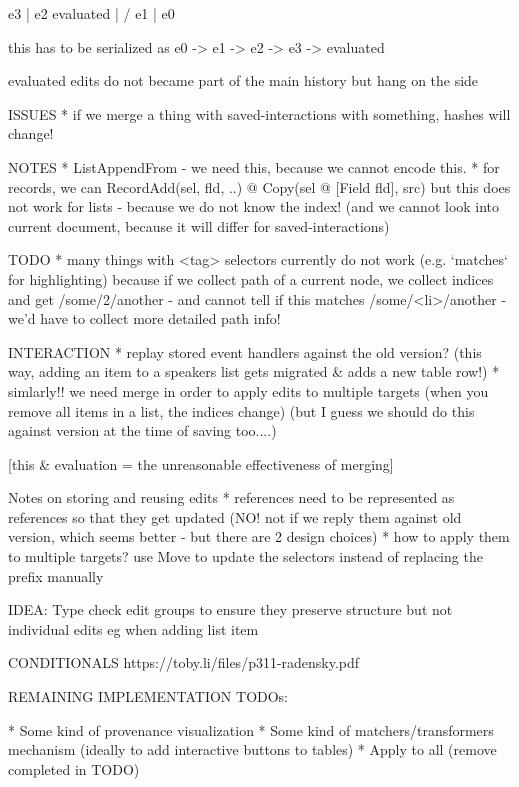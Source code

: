 \documentclass[sigconf,anonymous,screen]{acmart}
\begin{document}
  e3
  |
  e2   evaluated
  |  /
  e1
  |
  e0

  this has to be serialized as e0 -> e1 -> e2 -> e3 -> evaluated

  evaluated edits do not became part of the main history
  but hang on the side

ISSUES
* if we merge a thing with saved-interactions with something, hashes will change!

NOTES
* ListAppendFrom - we need this, because we cannot encode this.
* for records, we can RecordAdd(sel, fld, ..) @ Copy(sel @ [Field fld], src) but
  this does not work for lists - because we do not know the index!
  (and we cannot look into current document, because it will differ for saved-interactions)


TODO
* many things with <tag> selectors currently do not work
  (e.g. `matches` for highlighting) because if we collect path of a current node,
  we collect indices and get /some/2/another - and cannot tell if this matches
  /some/<li>/another - we'd have to collect more detailed path info!

INTERACTION
* replay stored event handlers against the old version?
  (this way, adding an item to a speakers list gets migrated \& adds a new table row!)
* simlarly!! we need merge in order to apply edits to multiple targets
  (when you remove all items in a list, the indices change)
  (but I guess we should do this against version at the time of saving too....)

[this \& evaluation = the unreasonable effectiveness of merging]

Notes on storing and reusing edits
* references need to be represented as references so that they get updated
  (NO! not if we reply them against old version, which seems better - but there are 2 design choices)
* how to apply them to multiple targets? use Move to update the selectors instead of
  replacing the prefix manually

IDEA: Type check edit groups to ensure they preserve structure but not individual edits eg when adding list item

CONDITIONALS
https://toby.li/files/p311-radensky.pdf


REMAINING IMPLEMENTATION TODOs:

* Some kind of provenance visualization
* Some kind of matchers/transformers mechanism (ideally to add interactive buttons to tables)
* Apply to all (remove completed in TODO)

\newpage
~
\end{document}
